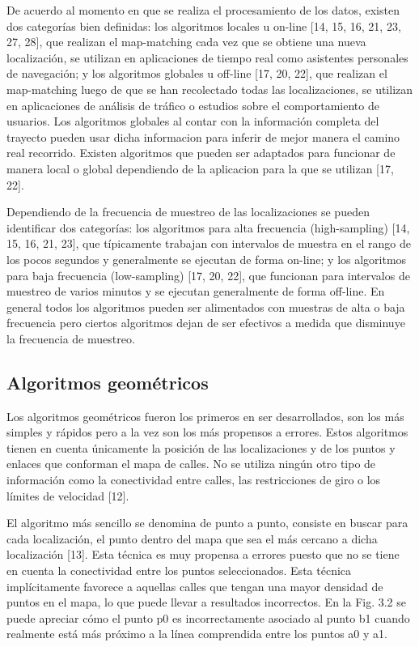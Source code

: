 \documentclass[final,fmstyle]{fpunathesis}
\begin{document}
De acuerdo al momento en que se realiza el procesamiento de los datos, existen dos categorías bien definidas: los algoritmos locales u on-line [14, 15, 16, 21, 23, 27, 28], que realizan el map-matching cada vez que se obtiene una nueva localización, se utilizan en aplicaciones de tiempo real como asistentes personales de navegación; y los algoritmos globales u off-line [17, 20, 22], que realizan el map-matching luego de que se han recolectado todas las localizaciones, se utilizan en aplicaciones de análisis de tráfico o estudios sobre el comportamiento de usuarios. Los algoritmos globales al contar con la información completa del trayecto pueden usar dicha informacion para inferir de mejor manera el camino real recorrido. Existen algoritmos que pueden ser adaptados para funcionar de manera local o global dependiendo de la aplicacion para la que se utilizan [17, 22].

Dependiendo de la frecuencia de muestreo de las localizaciones se pueden identificar dos categorías: los algoritmos para alta frecuencia (high-sampling) [14, 15, 16, 21, 23], que típicamente trabajan con intervalos de muestra en el rango de los pocos segundos y generalmente se ejecutan de forma on-line; y los algoritmos para baja frecuencia (low-sampling) [17, 20, 22],  que funcionan para intervalos de muestreo de varios minutos y se ejecutan generalmente de forma off-line. En general todos los algoritmos pueden ser alimentados con muestras de alta o baja frecuencia pero ciertos algoritmos dejan de ser efectivos a medida que disminuye la frecuencia de muestreo.

\subsection{Algoritmos geométricos}

Los algoritmos geométricos fueron los primeros en ser desarrollados, son los más simples y rápidos pero a la vez son los más propensos a errores. Estos algoritmos tienen en cuenta únicamente la posición de las localizaciones y de los puntos y enlaces que conforman el mapa de calles. No se utiliza ningún otro tipo de información como la conectividad entre calles, las restricciones de giro o los límites de velocidad [12].

El algoritmo más sencillo se denomina de punto a punto, consiste en buscar para cada localización, el punto dentro del mapa que sea el más cercano a dicha localización [13]. Esta técnica es muy propensa a errores puesto que no se tiene en cuenta la conectividad entre los puntos seleccionados. Esta técnica implícitamente favorece a aquellas calles que tengan una mayor densidad de puntos en el mapa, lo que puede llevar a resultados incorrectos. En la Fig. 3.2 se puede apreciar cómo el punto p0 es incorrectamente asociado al punto b1 cuando realmente está más próximo a la línea comprendida entre los puntos a0 y a1. 
\end{document}

